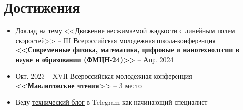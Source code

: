 \section{Достижения}
\begin{itemize} %
	\item Доклад на тему <<Движение несжимаемой жидкости с линейным полем скоростей>> – III Всероссийская молодежная школа-конференция \textbf{<<Современные физика, математика, цифровые и нанотехнологии в науке и образовании (ФМЦН-24)>>} – Апр. 2024
	\item Окт. 2023 – XVII Всероссийская молодежная конференция \textbf{<<Мавлютовские чтения>>} – 3 место
	\item Веду \underline{\href{https://t.me/in_ai_fog}{технический блог}} в Telegram как начинающий специалист
\end{itemize} %
